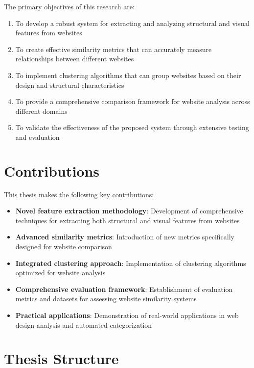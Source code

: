 The primary objectives of this research are:

\begin{enumerate}
    \item To develop a robust system for extracting and analyzing structural and visual features from websites
    \item To create effective similarity metrics that can accurately measure relationships between different websites
    \item To implement clustering algorithms that can group websites based on their design and structural characteristics
    \item To provide a comprehensive comparison framework for website analysis across different domains
    \item To validate the effectiveness of the proposed system through extensive testing and evaluation
\end{enumerate}

\section{Contributions}
\label{sec:contributions}

This thesis makes the following key contributions:

\begin{itemize}
    \item \textbf{Novel feature extraction methodology}: Development of comprehensive techniques for extracting both structural and visual features from websites
    \item \textbf{Advanced similarity metrics}: Introduction of new metrics specifically designed for website comparison
    \item \textbf{Integrated clustering approach}: Implementation of clustering algorithms optimized for website analysis
    \item \textbf{Comprehensive evaluation framework}: Establishment of evaluation metrics and datasets for assessing website similarity systems
    \item \textbf{Practical applications}: Demonstration of real-world applications in web design analysis and automated categorization
\end{itemize}

\section{Thesis Structure}
\label{sec:thesis-structure}

